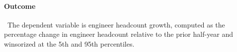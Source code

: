 \documentclass{article}
\begin{document}
\paragraph{Outcome}\ The dependent variable is engineer headcount growth, computed as the percentage change in engineer headcount relative to the prior half-year and winsorized at the 5th and 95th percentiles.


\end{document}

